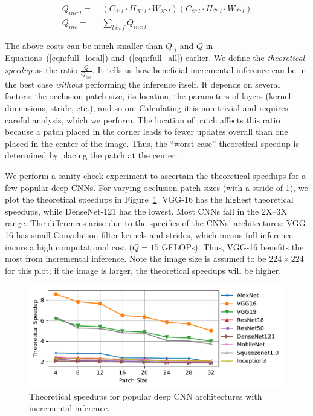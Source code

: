 \vspace{-2mm}
\begin{align}
\label{eqn:inc_local}
Q_{\mathit{inc}:l} =&~ (C_{\mathcal{I}:l} \cdot H_{\mathcal{K}:l} \cdot W_{\mathcal{K}:l})  (C_{\mathcal{O}:l} \cdot H_{\mathcal{P}:l} \cdot W_{\mathcal{P}:l})\\
\label{eqn:inc_all}
Q_\mathit{inc} =&~ \sum_{l~\mathit{in}~f} Q_{\mathit{inc}:l}
\end{align}

The above costs can be much smaller than $Q_{:l}$ and $Q$ in Equations~(\ref{eqn:full_local}) and~(\ref{eqn:full_all}) earlier.
We define the \textit{theoretical speedup} as the ratio $\frac{Q}{Q_\mathit{inc}}$. It tells us how beneficial incremental inference can be in the best case \textit{without} performing the inference itself. It depends on several factors: the occlusion patch size, its location, the parameters of layers (kernel dimensions, stride, etc.), and so on. Calculating it is non-trivial and requires careful analysis, which we perform. The location of patch affects this ratio because a patch placed in the corner leads to fewer updates overall than one placed in the center of the image. Thus, the ``worst-case'' theoretical speedup is determined by placing the patch at the center.

We perform a sanity check experiment to ascertain the theoretical speedups for a few popular deep CNNs. For varying occlusion patch sizes (with a stride of 1), we plot the theoretical speedups in Figure~\ref{fig:redundancy_ratio}. VGG-16 has the highest theoretical speedups, while DenseNet-121 has the lowest. Most CNNs fall in the 2X--3X range. The differences arise due to the specifics of the CNNs' architectures: VGG-16 has small Convolution filter kernels and strides, which means full inference incurs a high computational cost ($Q = 15$ GFLOPs). Thus, VGG-16 benefits the most from incremental inference. Note the image size is assumed to be $224 \times 224$ for this plot; if the image is larger, the theoretical speedups will be higher.

\begin{figure}[t]
\includegraphics[width=\columnwidth]{images/redundancy_ratio}
\vspace{-8mm}
\caption{Theoretical speedups for popular deep CNN architectures with incremental inference.}
\label{fig:redundancy_ratio}
\vspace{-4mm}
\end{figure}

